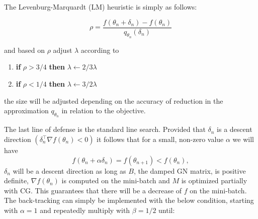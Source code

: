 
The Levenburg-Marquardt (LM) heuristic is simply as follows:

\[ \rho = \frac{f(\theta_n + \delta_n) - f(\theta_n)}{q_{\theta_n} (\delta_n)}\]

\noindent
and based on $\rho$ adjust $\lambda$ according to

\begin{enumerate}
    \item \textbf{if} $\rho > 3/4 $ \textbf{then} $\lambda\gets 2/3 \lambda$
    \item \textbf{if} $\rho<1/4$ \textbf{then} $\lambda \gets 3/2\lambda$
\end{enumerate} 

\noindent
the size will be adjusted depending on the accuracy of reduction in the approximation $q_{\theta_n}$ in relation to the objective. 

The last line of defense is the standard line search. Provided that $\delta_n$ is a descent direction $(\delta_n^\intercal \nabla f(\theta_n) < 0)$ it follows that for a small, non-zero value $\alpha$ we will have \[f(\theta_n + \alpha \delta_n) = f(\theta_{n+1}) < f(\theta_n),\] $\delta_n$ will be a descent direction as long as $B$, the damped GN matrix, is positive definite, $\nabla f(\theta_n)$ is computed on the mini-batch and $M$ is optimized partially with CG\cite{Martens2012}. This guarantees that there will be a decrease of $f$ on the mini-batch. The back-tracking can simply be implemented with the below condition, starting with $\alpha = 1$ and repeatedly multiply with $\beta = 1/2$ until:

